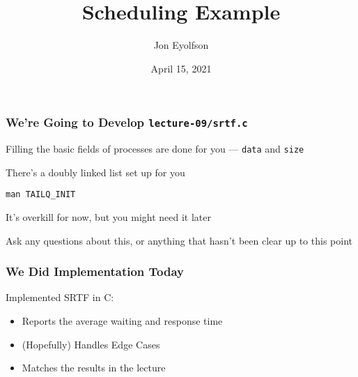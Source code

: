 

\title{Scheduling Example}
\author{Jon Eyolfson}
\date{April 15, 2021}


  \begin{frame}
    \titlepage
  \end{frame}

  \begin{frame}
    \frametitle{We're Going to Develop \texttt{lecture-09/srtf.c}}

    Filling the basic fields of processes are done for you --- \texttt{data} and \texttt{size}

    \vspace{2em}

    There's a doubly linked list set up for you

    \hspace{2em} \texttt{man TAILQ\_INIT}

    \hspace{4em} It's overkill for now, but you might need it later

    \vspace{2em}

    Ask any questions about this, or anything that hasn't been clear up to this
    point
  \end{frame}


  \begin{frame}
    \frametitle{We Did Implementation Today}

    Implemented SRTF in C:

    \begin{itemize}
      \item Reports the average waiting and response time
      \item (Hopefully) Handles Edge Cases
      \item Matches the results in the lecture
    \end{itemize}
  \end{frame}

